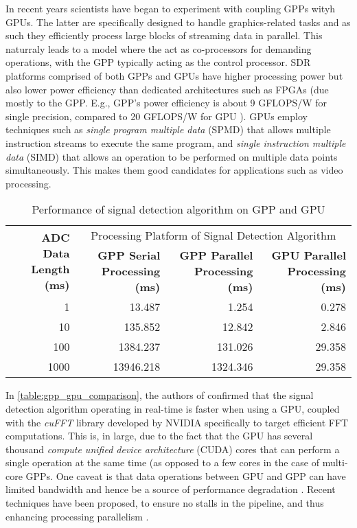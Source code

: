 In recent years scientists have began to experiment with coupling GPPs wityh GPUs. The latter are specifically designed to handle graphics-related tasks and as such they efficiently process large blocks of streaming data in parallel. This naturraly leads to a model where the act as co-processors for demanding operations, with the GPP typically acting as the control processor. SDR platforms comprised of both GPPs and GPUs have higher processing power but also lower power efficiency than dedicated architectures such as FPGAs (due mostly to the GPP. E.g., GPP's power efficiency is about 9 GFLOPS/W for single precision, compared to 20 GFLOPS/W for GPU \cite{v2014a}). GPUs employ techniques such as \emph{single program multiple data} (SPMD) that allows multiple instruction streams to execute the same program, and \emph{single instruction multiple data} (SIMD) that allows an operation to be performed on multiple data points simultaneously. This makes them good candidates for applications such as video processing.

\begin{table}[ht]
  \caption{Performance of signal detection algorithm on GPP and GPU \cite{fi2017a}}
  \label{table:gpp_gpu_comparison}
  \centering
  \begin{adjustbox}{width=1\textwidth}
  \begin{tabular}{r|r|r|r}
    \toprule
    \multirow{2}{*}{\textbf{ADC Data Length (ms)}} & \multicolumn{3}{c}{Processing Platform of Signal Detection Algorithm} \\
    \multirow{2}{*}{} & \textbf{GPP Serial Processing (ms)} & \textbf{GPP Parallel Processing (ms)} & \textbf{GPU Parallel Processing (ms)} \\
    \midrule
    1    & 13.487    & 1.254    & 0.278 \\
    10   & 135.852   & 12.842   & 2.846 \\
    100  & 1384.237  & 131.026  & 29.358 \\
    1000 & 13946.218 & 1324.346 & 29.358 \\
    \bottomrule
  \end{tabular}
  \end{adjustbox}
\end{table}

In \autoref{table:gpp_gpu_comparison}, the authors of \cite{fi2017a} confirmed that the signal detection algorithm operating in real-time is faster when using a GPU, coupled with the \emph{cuFFT} \cite{cuda_toolkit} library developed by NVIDIA specifically to target efficient FFT computations. This is, in large, due to the fact that the GPU has several thousand \emph{compute unified device architecture} (CUDA) cores that can perform a single operation at the same time (as opposed to a few cores in the case of multi-core GPPs. One caveat is that data operations between GPU and GPP can have limited bandwidth and hence be a source of performance degradation \cite{li2014a}. Recent techniques have been proposed, to ensure no stalls in the pipeline, and thus enhancing processing parallelism \cite{accelerating_massive_mimo_uplink} \cite{millage2010a}.


